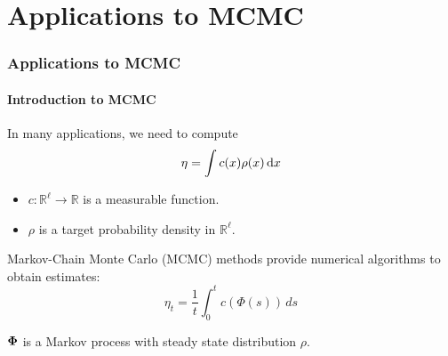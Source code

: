 \documentclass[xcolor=dvipsnames, subsection=false]{beamer}
\def\bfmath#1{{\mathchoice{\mbox{\boldmath$#1$}}%
{\mbox{\boldmath$#1$}}%
{\mbox{\boldmath$\scriptstyle#1$}}%
{\mbox{\boldmath$\scriptscriptstyle#1$}}}}
\def\bfPhi{\bfmath{\Phi}}
\newcommand{\field}[1]{\mathbb{#1}}
\def\Re{\field{R}}
\def\rmd{\,\textmd{d}}
\def\markovstate{\Phi}
\newcommand{\pr}{\rho}
\begin{document}

\section{Applications to MCMC}
\begin{frame}
\frametitle{Applications to MCMC}
\framesubtitle{Introduction to MCMC}
In many applications, we need to compute
\begin{equation*}
\eta = \int c(x)\pr(x) \rmd x
\label{e:eta}
\end{equation*}
\begin{itemize}
	\item $c\colon\Re^\ell\to\Re$ is a measurable function.
	\item $\pr$ is a target probability density in $\Re^\ell$.
\end{itemize}
 Markov-Chain Monte Carlo (MCMC) methods provide numerical algorithms to obtain estimates:
	\[
	\eta_t =\frac{1}{t}\int_0^t c(\markovstate(s)) \, ds
	\label{e:sample_mean}
	\]
\begin{center}
	$\bfPhi$ is a Markov process with steady state distribution $\pr$.
\end{center}
\end{frame}
\end{document}
